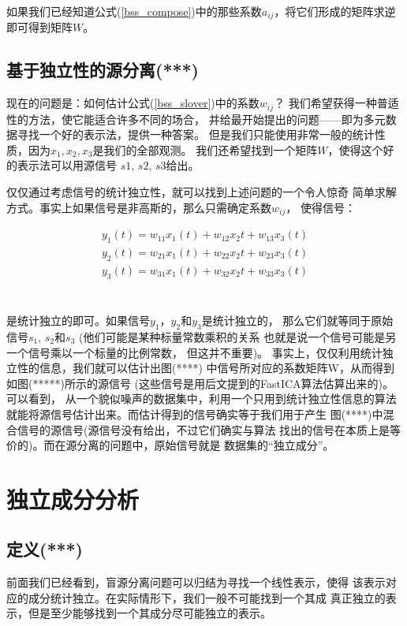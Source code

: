 如果我们已经知道公式(\ref{bss_compose})中的那些系数$a_{ij}$，将它们形成的矩阵求逆
即可得到矩阵$W$。
    
\subsection{基于独立性的源分离(***)}
现在的问题是：如何估计公式(\ref{bss_slover})中的系数$w_{ij}$？
我们希望获得一种普适性的方法，使它能适合许多不同的场合，
并给最开始提出的问题——即为多元数据寻找一个好的表示法，提供一种答案。
但是我们只能使用非常一般的统计性质，因为$x_1, x_2, x_3$是我们的全部观测。
我们还希望找到一个矩阵$W$，使得这个好的表示法可以用源信号
$s1$, $s2$, $s3$给出。
    
仅仅通过考虑信号的统计独立性，就可以找到上述问题的一个令人惊奇
简单求解方式。事实上如果信号是非高斯的，那么只需确定系数$w_{ij}$，
使得信号：
\parbox{10cm}{
\begin{eqnarray*}
y_1(t)=w_{11}x_1(t)+w_{12}x_2{t}+w_{13}x_3(t) \\
y_2(t)=w_{21}x_1(t)+w_{22}x_2{t}+w_{23}x_3(t) \\
y_3(t)=w_{31}x_1(t)+w_{32}x_2{t}+w_{33}x_3(t) \\
\end{eqnarray*}
}\hfill
\parbox{3cm}{\begin{eqnarray}\label{bss_slover} \end{eqnarray}}

是统计独立的即可。如果信号$y_1$，$y_2$和$y_3$是统计独立的，
那么它们就等同于原始信号$s_1$, $s_2$和$s_3$
(他们可能是某种标量常数乘积的关系
也就是说一个信号可能是另一个信号乘以一个标量的比例常数，
但这并不重要)。
    事实上，仅仅利用统计独立性的信息，我们就可以估计出图(****)
中信号所对应的系数矩阵W，从而得到如图(*****)所示的源信号
(这些信号是用后文提到的FastICA算法估算出来的)。可以看到，
从一个貌似噪声的数据集中，利用一个只用到统计独立性信息的算法
就能将源信号估计出来。而估计得到的信号确实等于我们用于产生
图(****)中混合信号的源信号(源信号没有给出，不过它们确实与算法
找出的信号在本质上是等价的)。而在源分离的问题中，原始信号就是
数据集的“独立成分”。


\section{独立成分分析}
\subsection{定义(***)}
前面我们已经看到，盲源分离问题可以归结为寻找一个线性表示，使得
该表示对应的成分统计独立。在实际情形下，我们一般不可能找到一个其成
真正独立的表示，但是至少能够找到一个其成分尽可能独立的表示。

